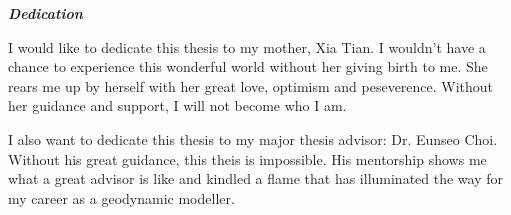 \begin{center}
\textbf{\textit{Dedication}}
\end{center}

I would like to dedicate this thesis to my mother, Xia Tian. I wouldn't have a chance to experience this wonderful world without her giving birth to me. She rears me up by herself with her great love, optimism and peseverence. Without her guidance and support, I will not become who I am.

I also want to dedicate this thesis to my major thesis advisor: Dr. Eunseo Choi. Without his great guidance, this theis is impossible. His mentorship shows me what a great advisor is like and kindled a flame that has illuminated the way for my career as a geodynamic modeller.   

